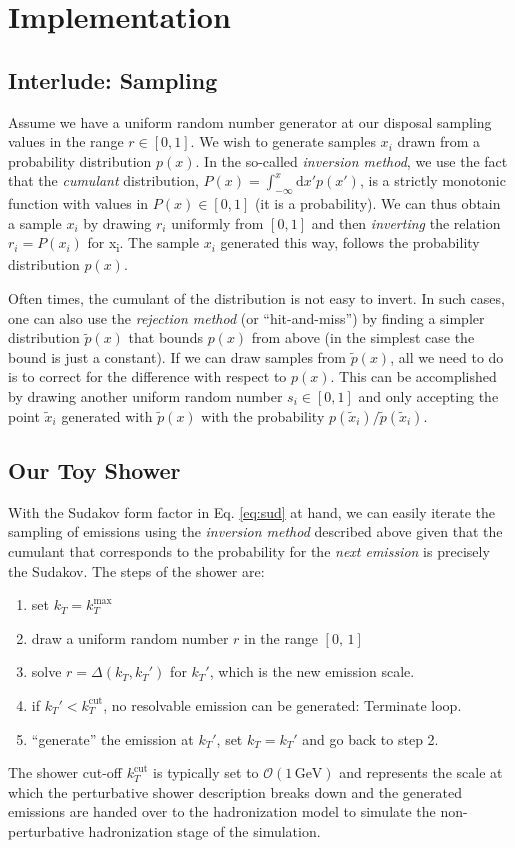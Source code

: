\documentclass[11pt]{article}
\begin{document}
\section{Implementation}
\label{sec:org14c8364}

\subsection{Interlude: Sampling}
\label{sec:org412f00e}
Assume we have a uniform random number generator at our disposal sampling values in the range \(r\in[0,1]\).
We wish to generate samples \(x_i\) drawn from a probability distribution \(p(x)\).
In the so-called \emph{inversion method}, we use the fact that the \emph{cumulant} distribution, \(P(x) = \int_{-\infty}^x\mathrm{d}x' p(x')\), is a strictly monotonic function with values in \(P(x)\in[0,1]\) (it is a probability).
We can thus obtain a sample \(x_i\) by drawing \(r_i\) uniformly from \([0,1]\) and then \emph{inverting} the relation \(r_i = P(x_i)\) for x\textsubscript{i}.
The sample \(x_i\) generated this way, follows the probability distribution \(p(x)\).

Often times, the cumulant of the distribution is not easy to invert.
In such cases, one can also use the \emph{rejection method} (or ``hit-and-miss'') by finding a simpler distribution \(\tilde{p}(x)\) that bounds \(p(x)\) from above (in the simplest case the bound is just a constant).
If we can draw samples from \(\tilde{p}(x)\), all we need to do is to correct for the difference with respect to \(p(x)\).
This can be accomplished by drawing another uniform random number \(s_i\in[0,1]\) and only accepting the point \(\tilde{x}_i\) generated with \(\tilde{p}(x)\) with the probability \(p(\tilde{x}_i)/\tilde{p}(\tilde{x}_i)\).
\subsection{Our Toy Shower}
\label{sec:org8cff7a6}
With the Sudakov form factor in Eq. \eqref{eq:sud} at hand, we can easily iterate the sampling of emissions using the \emph{inversion method} described above given that the cumulant that corresponds to the probability for the \emph{next emission} is precisely the Sudakov.
The steps of the shower are:
\begin{enumerate}
\item set \(k_T = k_T^\mathrm{max}\)
\item draw a uniform random number \(r\) in the range \([0,\,1]\)
\item solve \(r = \Delta(k_T, k_T')\) for \(k_T'\), which is the new emission scale.
\item if \(k_T'<k_T^\mathrm{cut}\), no resolvable emission can be generated:
Terminate loop.
\item ``generate'' the emission at \(k_T'\), set \(k_T = k_T'\) and go back to step 2.
\end{enumerate}
The shower cut-off \(k_T^\mathrm{cut}\) is typically set to \(\mathcal{O}(1\,\mathrm{GeV})\) and represents the scale at which the perturbative shower description breaks down and the generated emissions are handed over to the hadronization model to simulate the non-perturbative hadronization stage of the simulation.
\end{document}
